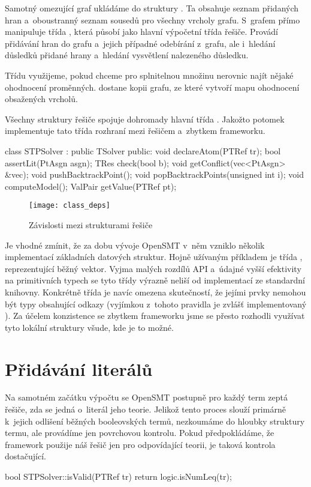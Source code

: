 Samotný omezující graf ukládáme do struktury . Ta obsahuje seznam přidaných hran a~oboustranný seznam sousedů pro všechny vrcholy grafu. S~grafem přímo manipuluje třída , která působí jako hlavní výpočetní třída řešiče. Provádí přidávání hran do grafu a~jejich případné odebírání z~grafu, ale i~hledání důsledků přidané hrany a~hledání vysvětlení nalezeného důsledku.

Třídu  využijeme, pokud chceme pro splnitelnou množinu nerovnic najít nějaké ohodnocení proměnných.  dostane kopii grafu, ze které vytvoří mapu ohodnocení obsažených vrcholů.

Všechny struktury řešiče spojuje dohromady hlavní třída . Jakožto potomek  implementuje tato třída rozhraní mezi řešičem a~zbytkem frameworku. %
\begin{code}[labelposition=bottomline,label=Základní API třídy STPSolver]
class STPSolver : public TSolver {
public:
	void declareAtom(PTRef tr);
	bool assertLit(PtAsgn asgn);
	TRes check(bool b);
	void getConflict(vec<PtAsgn> &vec);
	void pushBacktrackPoint();
	void popBacktrackPoints(unsigned int i);
	void computeModel();
	ValPair getValue(PTRef pt);
}
\end{code}

\begin{figure}
	\centering
	\texttt{[image: class\_deps]}
	\caption{Závislosti mezi strukturami řešiče}
\end{figure}

Je vhodné zmínit, že za dobu vývoje OpenSMT v~něm vzniklo několik implementací základních datových struktur. Hojně užívaným příkladem je třída , reprezentující běžný vektor. Vyjma malých rozdílů API a~údajné vyšší efektivity na primitivních typech se tyto třídy výrazně neliší od implementací ze standardní knihovny. Konkrétně třída  je navíc omezena skutečností, že jejími prvky nemohou být typy obsahující odkazy (vyjímkou z~tohoto pravidla je zvlášť implementovaný ). Za účelem konzistence se zbytkem frameworku jsme se přesto rozhodli využívat tyto lokální struktury všude, kde je to možné. 
\newpage
\section{Přidávání literálů}\label{add}

Na samotném začátku výpočtu se OpenSMT postupně pro každý term zeptá řešiče, zda se jedná o~literál jeho teorie. Jelikož tento proces slouží primárně k~jejich odlišení běžných booleovských termů, nezkoumáme do hloubky struktury termu, ale provádíme jen povrchovou kontrolu. Pokud předpokládáme, že framework použije náš řešič jen pro odpovídající teorii, je taková kontrola dostačující.
\begin{code}
bool STPSolver::isValid(PTRef tr) { return logic.isNumLeq(tr); }
\end{code}

